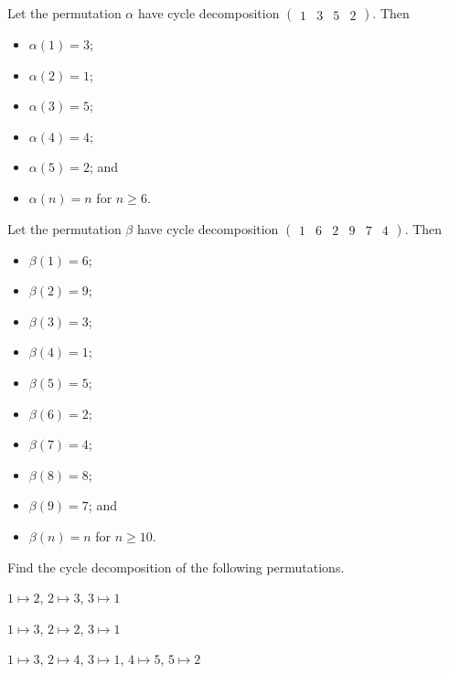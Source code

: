 \newpage

\begin{example}
    Let the permutation $\alpha$ have cycle decomposition $\begin{pmatrix}1 & 3 & 5 & 2\end{pmatrix}$. Then
    \begin{multicols}{3}
        \begin{itemize}
            \item $\alpha(1) = 3$;
            \item $\alpha(2) = 1$;
            \item $\alpha(3) = 5$;
            \item $\alpha(4) = 4$;
            \item $\alpha(5) = 2$; and
            \item $\alpha(n) = n$ for $n \geq 6$.
        \end{itemize}
    \end{multicols}
\end{example}

\begin{example}
    Let the permutation $\beta$ have cycle decomposition $\begin{pmatrix}1 & 6 & 2 & 9 & 7 & 4\end{pmatrix}$. Then
    \begin{multicols}{3}
        \begin{itemize}
            \item $\beta(1) = 6$;
            \item $\beta(2) = 9$;
            \item $\beta(3) = 3$;
            \item $\beta(4) = 1$;
            \item $\beta(5) = 5$;
            \item $\beta(6) = 2$;
            \item $\beta(7) = 4$;
            \item $\beta(8) = 8$;
            \item $\beta(9) = 7$; and
            \item $\beta(n) = n$ for $n \geq 10$.
        \end{itemize}
    \end{multicols}
\end{example}

\begin{exercise}
    Find the cycle decomposition of the following permutations.
    \begin{partquestions}{\alph*}
        \item $1 \mapsto 2$, $2 \mapsto 3$, $3 \mapsto 1$
        \item $1 \mapsto 3$, $2 \mapsto 2$, $3 \mapsto 1$
        \item $1 \mapsto 3$, $2 \mapsto 4$, $3 \mapsto 1$, $4 \mapsto 5$, $5 \mapsto 2$
    \end{partquestions}
\end{exercise}

